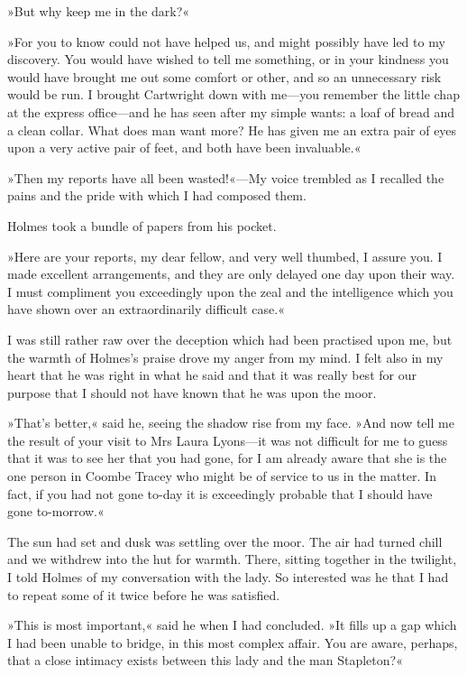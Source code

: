 »But why keep me in the dark?«

»For you to know could not have helped us, and might possibly have led to my discovery. You would have wished to tell me something, or in your kindness you would have brought me out some comfort or other, and so an unnecessary risk would be run. I brought Cartwright down with me\allowbreak---\allowbreak you remember the little chap at the express office\allowbreak---\allowbreak and he has seen after my simple wants: a loaf of bread and a clean collar. What does man want more? He has given me an extra pair of eyes upon a very active pair of feet, and both have been invaluable.«

»Then my reports have all been wasted!«\allowbreak---\allowbreak My voice trembled as I recalled the pains and the pride with which I had composed them.

Holmes took a bundle of papers from his pocket.

»Here are your reports, my dear fellow, and very well thumbed, I assure you. I made excellent arrangements, and they are only delayed one day upon their way. I must compliment you exceedingly upon the zeal and the intelligence which you have shown over an extraordinarily difficult case.«

I was still rather raw over the deception which had been practised upon me, but the warmth of Holmes's praise drove my anger from my mind. I felt also in my heart that he was right in what he said and that it was really best for our purpose that I should not have known that he was upon the moor.

»That's better,« said he, seeing the shadow rise from my face. »And now tell me the result of your visit to Mrs Laura Lyons\allowbreak---\allowbreak it was not difficult for me to guess that it was to see her that you had gone, for I am already aware that she is the one person in Coombe Tracey who might be of service to us in the matter. In fact, if you had not gone to-day it is exceedingly probable that I should have gone to-morrow.«

The sun had set and dusk was settling over the moor. The air had turned chill and we withdrew into the hut for warmth. There, sitting together in the twilight, I told Holmes of my conversation with the lady. So interested was he that I had to repeat some of it twice before he was satisfied.

»This is most important,« said he when I had concluded. »It fills up a gap which I had been unable to bridge, in this most complex affair. You are aware, perhaps, that a close intimacy exists between this lady and the man Stapleton?«

